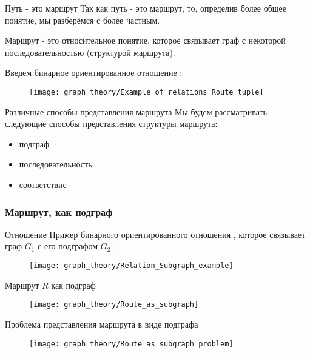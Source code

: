 \begin{frame}{Путь - это маршрут}
  Так как путь - это маршрут, то, определив более общее понятие, мы
  разберёмся с более частным.

  Маршрут - это относительное понятие, которое связывает граф с
  некоторой последовательностью (структурой маршрута).

  Введем бинарное ориентированное отношение :
  \begin{figure}
    \centering
    \texttt{[image: graph\_theory/Example\_of\_relations\_Route\_tuple]}
  \end{figure}
\end{frame}

\begin{frame}{Различные способы представления маршрута}
  Мы будем рассматривать следующие способы представления структуры
  маршрута:
  \begin{itemize}
  \item подграф
  \item последовательность
  \item соответствие
  \end{itemize}
\end{frame}

\subsubsection{Маршрут, как подграф}

\begin{frame}{Отношение }
  Пример бинарного ориентированного отношения ,
  которое связывает граф $G_1$ с его подграфом $G_2$:
  \begin{figure}
    \centering
    \texttt{[image: graph\_theory/Relation\_Subgraph\_example]}
  \end{figure}
\end{frame}

\begin{frame}{Маршрут $R$ как подграф}
  \begin{figure}
    \centering
    \texttt{[image: graph\_theory/Route\_as\_subgraph]}
  \end{figure}
\end{frame}

\begin{frame}{Проблема представления маршрута в виде подграфа}
  \begin{figure}
    \centering
    \texttt{[image: graph\_theory/Route\_as\_subgraph\_problem]}
  \end{figure}
\end{frame}


